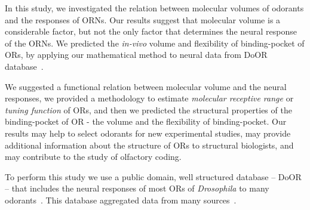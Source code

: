 \documentclass[11pt]{paper} %
\begin{document}
In this study, 
we investigated the relation between molecular volumes of odorants and the responses of ORNs. 
Our results suggest that molecular volume is a considerable factor, 
but not the only factor that determines the neural response of the ORNs.
We predicted the {\it in-vivo} volume and flexibility of binding-pocket of ORs, 
by applying our mathematical method to neural data from DoOR database~\cite{Galizia2010}. 

We suggested a functional relation between molecular volume and the neural responses, 
we provided a methodology to estimate {\it molecular receptive range} or {\it tuning function} of ORs,
and then we predicted the structural properties of the binding-pocket of OR - the volume and the flexibility of binding-pocket.
Our results may help to select odorants  for new experimental studies, 
may provide additional information about the structure of ORs to structural biologists, 
and may contribute to the study of olfactory coding.

To perform this study we use a public domain, 
well structured database -- DoOR -- 
that includes the neural responses of most ORs of \textit{Drosophila} to many odorants~\cite{Galizia2010}. 
This database aggregated data from many sources~\cite{Bruyne1999,Bruyne2001,Dobritsa2003,Goldman2005,Hallem2004,Hallem2006,
Kreher2005,Kreher2008,Kwon2007,Pelz2006,Pelz2006,Schmuker2007,Stensmyr2003,
Turner2009,VanderGoesvanNaters2007,Yao2005}.







\end{document}
